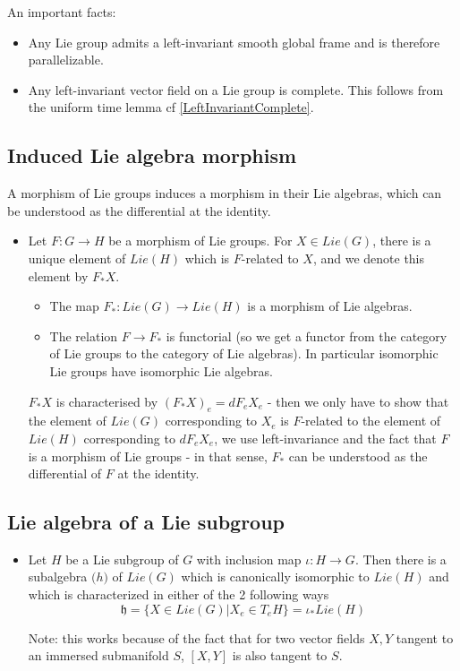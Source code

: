 \documentclass{report}
\theoremstyle{definition}
\begin{document}
An important facts:
\begin{itemize}
    \item Any Lie group admits a left-invariant smooth global frame and is therefore parallelizable.
    \item Any left-invariant vector field on a Lie group is complete. This follows from the uniform time lemma cf \ref{LeftInvariantComplete}.
\end{itemize}

\subsection{Induced Lie algebra morphism}

A morphism of Lie groups induces a morphism in their Lie algebras, which can be understood as the differential at the identity.
\begin{itemize}
    \item Let $F:G\to H$ be a morphism of Lie groups. For $X\in Lie(G)$, there is a unique element of $Lie(H)$ which is $F$-related to $X$, and we denote this element by $F_*X$.
    \begin{itemize}
        \item The map $F_*:Lie(G)\to Lie(H)$ is a morphism of Lie algebras.
        \item The relation $F\to F_*$ is functorial (so we get a functor from the category of Lie groups to the category of Lie algebras). In particular isomorphic Lie groups have isomorphic Lie algebras.
    \end{itemize}

    $F_*X$ is characterised by $(F_*X)_e=dF_eX_e$ - then we only have to show that the element of $Lie(G)$ corresponding to $X_e$ is $F$-related to the element of $Lie(H)$ corresponding to $dF_eX_e$, we use left-invariance and the fact that $F$ is a morphism of Lie groups - in that sense, $F_*$ can be understood as the differential of $F$ at the identity.
\end{itemize}

\subsection{Lie algebra of a Lie subgroup}

\begin{itemize}
    \item Let $H$ be a Lie subgroup of $G$ with inclusion map $\iota:H\to G$. Then there is a subalgebra $\mathfrak(h)$ of $Lie(G)$ which is canonically isomorphic to $Lie(H)$ and which is characterized in either of the 2 following ways
    \begin{equation*}
        \mathfrak{h}=\{X\in Lie(G)|X_e\in T_eH\}=\iota_*Lie(H)
    \end{equation*}

    Note: this works because of the fact that for two vector fields $X,Y$ tangent to an immersed submanifold $S$, $[X,Y]$ is also tangent to $S$.
\end{itemize}
\end{document}
